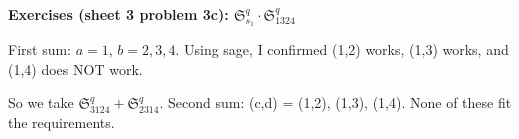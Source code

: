 \textbf{Exercises (sheet 3 problem 3c): $\mathfrak{S}_{s_1}^q \cdot \mathfrak{S}_{1324}^q$}

First sum: $a = 1$, $b = 2, 3, 4$. Using sage, I confirmed (1,2) works, (1,3) works, and (1,4) does NOT work.

So we take $\mathfrak{S}_{3124}^q + \mathfrak{S}_{2314}^q$. 
Second sum: (c,d) = (1,2), (1,3), (1,4). None of these fit the requirements.


